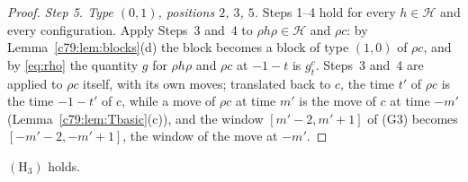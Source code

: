 \begin{proof}
\emph{Step 5. Type $(0,1)$, positions $2$, $3$, $5$.} Steps 1--4 hold for every $h\in\mathcal H$ and every configuration. Apply Steps~3 and~4 to $\rho h\rho\in\mathcal H$ and $\rho c$: by Lemma~\ref{c79:lem:blocks}(d) the block becomes a block of type $(1,0)$ of $\rho c$, and by \eqref{eq:rho} the quantity $g$ for $\rho h\rho$ and $\rho c$ at $-1-t$ is $g^c_t$. Steps~3 and~4 are applied to $\rho c$ itself, with its own moves; translated back to $c$, the time $t'$ of $\rho c$ is the time $-1-t'$ of $c$, while a move of $\rho c$ at time $m'$ is the move of $c$ at time $-m'$ (Lemma~\ref{c79:lem:Tbasic}(c)), and the window $[m'-2,m'+1]$ of (G3) becomes $[-m'-2,-m'+1]$, the window of the move at $-m'$.
\end{proof}

\begin{proposition}[$(\mathrm H_3)$]\label{c79:prop:H3}
$(\mathrm H_3)$ holds.
\end{proposition}

